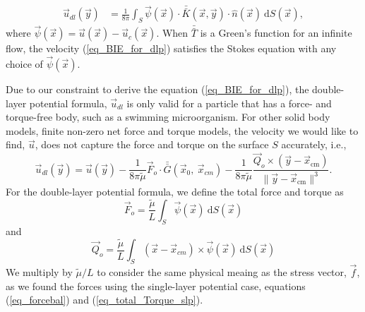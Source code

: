 \begin{align}
   \vec{u}_{dl}(\vec{y}) & =
	\frac{1}{8 \pi } \int_S  
	\vec{\psi}(\vec{x})
	\cdot  \bar{\bar{K}}(\vec{x},\vec{y})  
	\cdot \hat{n} ( \vec{x})
	\ \text{d}S(\vec{x}),
\label{eq_BIE_for_dlp}
\end{align}
where $
	\vec{\psi}(\vec{x}) =    \vec{u}(\vec{x})  - \vec{u}_c (\vec{x})$.
When $\bar{\bar{T }}$ is a Green's function for an infinite flow, the velocity (\ref{eq_BIE_for_dlp}) satisfies the Stokes equation with any choice of $\vec{\psi}(\vec{x}) $.
\par
%
Due to our constraint to derive the equation (\ref{eq_BIE_for_dlp}), the double-layer potential formula, $\vec{u}_{dl}$ is only valid for a particle that has a force- and torque-free body, such as a swimming microorganism.
For other solid body models, finite non-zero net force and torque models, the velocity we would like to find, $\vec{u}$, does not capture the force and torque on the surface $S$ accurately, i.e., 
\begin{equation}
\vec{u}_{dl}(\vec{y}) = \vec{u}(\vec{y}) 
- \frac{1}{8 \pi \tilde{\mu} }\vec{F}_o \cdot \bar{\bar{G}}(\vec{x}_{0}, \ \vec{x}_{cm})
- \frac{1}{8 \pi \tilde{\mu} } \frac{\vec{Q}_o \times  (\vec{y}   - \vec{x}_{\text{cm}} ) }{\| \vec{y}   - \vec{x}_{\text{cm}} \|^3 }.
\label{eq_v_dlp}
\end{equation}
For the double-layer potential formula, we define the total force and torque as
\begin{equation}
 \vec{F}_o
  = \frac{\tilde{\mu}}{L} \int_S \vec{\psi}(\vec{x}) \  \text{d}S(\vec{x})
 \label{alpha_dl}
 \end{equation} 
 and
 \begin{equation}
 \vec{Q}_o 
 = \frac{\tilde{\mu}}{L} \int_S (\vec{x} - \vec{x}_{cm}) \times \vec{\psi}(\vec{x})  \ \text{d}S(\vec{x})
 \label{omega_dl}
 \end{equation}
%
We multiply by $\tilde{\mu} / L$ to consider the same physical meaing as the stress vector, $\vec{f}$, as we found the forces using the single-layer potential case, equations (\ref{eq_forcebal}) and (\ref{eq_total_Torque_slp}).
